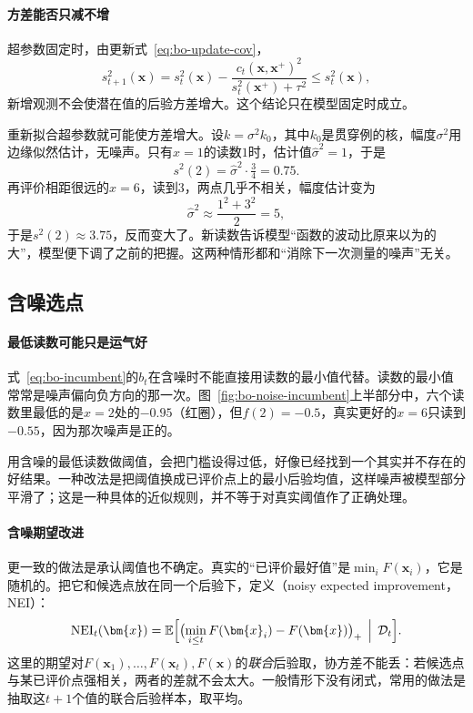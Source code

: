 \paragraph{方差能否只减不增}
超参数固定时，由更新式~\eqref{eq:bo-update-cov}，
\[
 s_{t+1}^2(\bm{x})=s_t^2(\bm{x})-\frac{c_t(\bm{x},\bm{x}^+)^2}{s_t^2(\bm{x}^+)+\tau^2}\leq s_t^2(\bm{x}),
\]
新增观测不会使潜在值的后验方差增大。这个结论只在模型固定时成立。

重新拟合超参数就可能使方差增大。设$k=\sigma^2k_0$，其中$k_0$是贯穿例的核，幅度$\sigma^2$用边缘似然估计，无噪声。只有$x=1$的读数$1$时，估计值$\widehat{\sigma}^2=1$，于是
\[
 s^2(2)=\widehat{\sigma}^2\cdot\tfrac34=0.75.
\]
再评价相距很远的$x=6$，读到$3$，两点几乎不相关，幅度估计变为
\[
 \widehat{\sigma}^2\approx\frac{1^2+3^2}{2}=5,
\]
于是$s^2(2)\approx3.75$，反而变大了。新读数告诉模型“函数的波动比原来以为的大”，模型便下调了之前的把握。这两种情形都和“消除下一次测量的噪声”无关。

\subsection{含噪选点}
\label{sec:bo-noisy-selection}

\paragraph{最低读数可能只是运气好}
式~\eqref{eq:bo-incumbent}的$b_t$在含噪时不能直接用读数的最小值代替。读数的最小值常常是噪声偏向负方向的那一次。图~\ref{fig:bo-noise-incumbent}上半部分中，六个读数里最低的是$x=2$处的$-0.95$（红圈），但$f(2)=-0.5$，真实更好的$x=6$只读到$-0.55$，因为那次噪声是正的。

用含噪的最低读数做阈值，会把门槛设得过低，好像已经找到一个其实并不存在的好结果。一种改法是把阈值换成已评价点上的最小后验均值，这样噪声被模型部分平滑了；这是一种具体的近似规则，并不等于对真实阈值作了正确处理。

\paragraph{含噪期望改进}
更一致的做法是承认阈值也不确定。真实的“已评价最好值”是$\min_iF(\bm{x}_i)$，它是随机的。把它和候选点放在同一个后验下，定义（noisy expected improvement，NEI）：
\begin{equation}
 \mathrm{NEI}_t(\bm{x})=\mathbb{E}\Bigl[\bigl(\min_{i\leq t}F(\bm{x}_i)-F(\bm{x})\bigr)_+\,\Bigm|\,\mathcal{D}_t\Bigr].
 \label{eq:bo-nei}
\end{equation}
这里的期望对$F(\bm{x}_1),\ldots,F(\bm{x}_t),F(\bm{x})$的\emph{联合}后验取，协方差不能丢：若候选点与某已评价点强相关，两者的差就不会太大。一般情形下没有闭式，常用的做法是抽取这$t+1$个值的联合后验样本，取平均。

